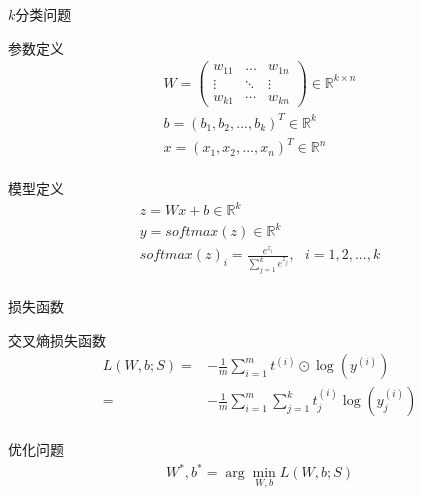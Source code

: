 \begin{frame}[fragile]{$k$分类问题}
\begin{block}{参数定义}
\[\begin{gathered}
  W = \left( {\begin{array}{*{20}{c}}
  {{w_{11}}}& \ldots &{{w_{1n}}} \\ 
   \vdots & \ddots & \vdots  \\ 
  {{w_{k1}}}& \cdots &{{w_{kn}}} 
\end{array}} \right) \in {\mathbb{R}^{k \times n}} \\ 
  b = {({b_1},{b_2},...,{b_k})^T} \in {\mathbb{R}^k} \\ 
  x = {({x_1},{x_2},...,{x_n})^T} \in {\mathbb{R}^n} \\ 
\end{gathered} \]
\end{block}  

\begin{block}{模型定义}  
\[\begin{gathered}
  z = Wx + b \in {\mathbb{R}^k} \\
  y = softmax(z) \in {\mathbb{R}^k} \\ 
  softmax {(z)_i} = \tfrac{{{e^{{z_i}}}}}{{\sum\limits_{j = 1}^k {{e^{{z_j}}}} }}, \text{ } i=1,2,...,k\\
\end{gathered} \]
\end{block}
\end{frame}

\begin{frame}[fragile]{损失函数}
\begin{block}{交叉熵损失函数}  
\[\begin{aligned}
  L(W,b;S) =  &  - \frac{1}{m}\sum\limits_{i = 1}^m {{t^{(i)}} \odot \log \left( {{y^{(i)}}} \right)}  \\ 
   =  &  - \frac{1}{m}\sum\limits_{i = 1}^m {\sum\limits_{j = 1}^k {t_j^{(i)}\log \left( {y_j^{(i)}} \right)} }  \\ 
\end{aligned} \]
\end{block}

\begin{block}{优化问题}  
\[\begin{aligned}
  {W^*},{b^*} = \arg \mathop {\min }\limits_{W,b} L(W,b;S)
\end{aligned} \]
\end{block}
\end{frame}

